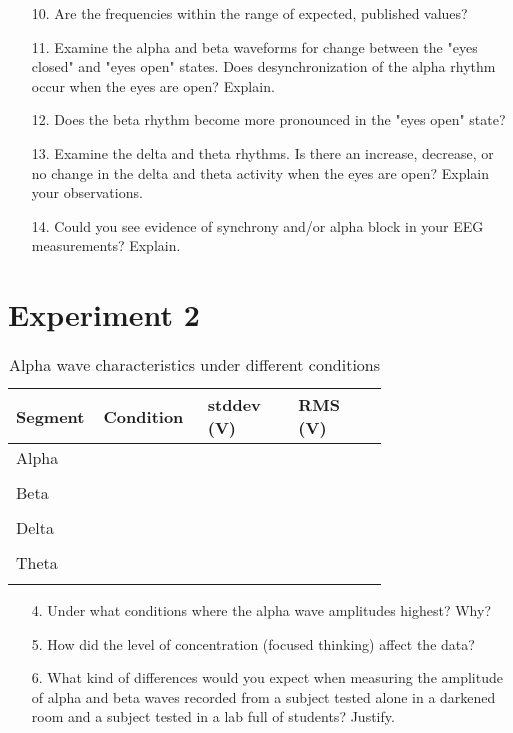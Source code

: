 \documentclass{article}
\begin{document}
\begin{itemize}
	\item[10.] Are the frequencies within the range of expected, published values?\vspace{1cm}
	\item[11.] Examine the alpha and beta waveforms for change between the "eyes closed" and "eyes open" states. Does desynchronization of the alpha rhythm occur when the eyes are open? Explain.\vspace{3cm}
	\item[12.] Does the beta rhythm become more pronounced in the "eyes open" state?\vspace{1cm}
	\item[13.] Examine the delta and theta rhythms. Is there an increase, decrease, or no change in the delta and theta activity when the eyes are open? Explain your observations.\vspace{4cm}
	\item[14.] Could you see evidence of synchrony and/or alpha block in your EEG measurements? Explain.
\end{itemize}
\pagebreak

\section*{Experiment 2}
\begin{table}[h]
	\centering
	\caption{Alpha wave characteristics under different conditions}
	\begin{tabular}[h!]{p{0.08\linewidth}|p{0.22\linewidth}p{0.22\linewidth}p{0.22\linewidth}}
	\toprule
	Segment  & Condition & stddev (\textmu V) & RMS (\textmu V)\\
	\midrule
	Alpha & & &\\& & &\\
	\midrule
	Beta & & &\\& & &\\
	\midrule
	Delta & & &\\& & &\\
	\midrule
	Theta & & &\\& & &\\
	\bottomrule
	\end{tabular}
	\end{table}

\begin{itemize}
	\item[4.] Under what conditions where the alpha wave amplitudes highest? Why?\vspace{3.5cm}
	\item[5.] How did the level of concentration (focused thinking) affect the data?\vspace{3.5cm}
	\item[6.] What kind of differences would you expect when measuring the amplitude of alpha and beta waves recorded from a subject tested alone in a darkened room and a subject tested in a lab full of students? Justify.\vspace{4cm}
\end{itemize}
\end{document}
